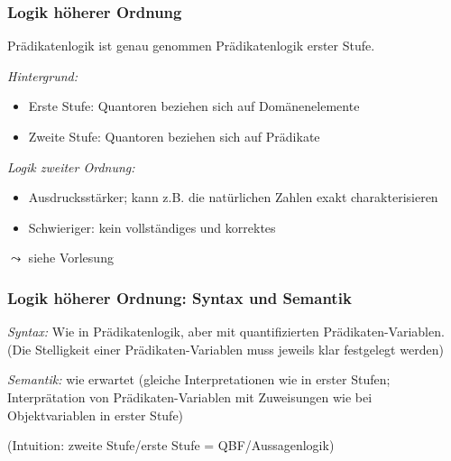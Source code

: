 \documentclass[aspectratio=1610,onlymath]{beamer}
\begin{document}
\begin{frame}\frametitle{Logik höherer Ordnung}

Prädikatenlogik ist genau genommen \alert{Prädikatenlogik erster Stufe}.
\bigskip

\emph{Hintergrund:}
\begin{itemize}
\item Erste Stufe: Quantoren beziehen sich auf Domänenelemente\smallskip

\item Zweite Stufe: Quantoren beziehen sich auf Prädikate\smallskip

\end{itemize}\bigskip

\emph{Logik zweiter Ordnung:}
\begin{itemize}
\item Ausdrucksstärker; kann z.B. die natürlichen Zahlen exakt charakterisieren
\item Schwieriger: kein vollständiges und korrektes 
\end{itemize}

$\leadsto$ siehe Vorlesung 

\end{frame}

\begin{frame}\frametitle{Logik höherer Ordnung: Syntax und Semantik}

\emph{Syntax:} Wie in Prädikatenlogik, aber mit quantifizierten Prädikaten-Variablen.\\
\textcolor{devilscss}{(Die Stelligkeit einer Prädikaten-Variablen muss jeweils klar festgelegt werden)}\medskip

\bigskip\pause

\emph{Semantik:} wie erwartet (gleiche Interpretationen wie in erster Stufen; Interprätation von Prädikaten-Variablen mit Zuweisungen wie bei Objektvariablen in erster Stufe)\medskip

\textcolor{devilscss}{(Intuition: zweite Stufe/erste Stufe = QBF/Aussagenlogik)}

\end{frame}
\end{document}
